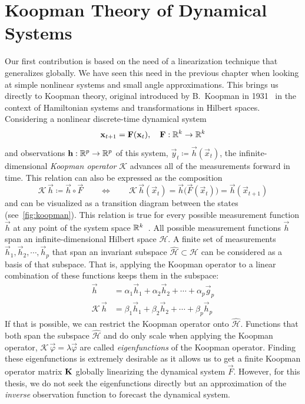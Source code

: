 \section{Koopman Theory of Dynamical Systems}
	Our first contribution is based on the need of a linearization technique that generalizes globally. We have seen this need in the previous chapter when looking at simple nonlinear systems and small angle approximations. This brings us directly to Koopman theory, original introduced by B.~Koopman in 1931~\cite{koopmanHamiltonianSystemsTransformation1931} in the context of Hamiltonian systems and transformations in Hilbert spaces. Considering a nonlinear discrete-time dynamical system
	\begin{equation*}
		\boldsymbol{\mathrm{x}}_{t + 1} = \boldsymbol{\mathrm{F}}(\boldsymbol{\mathrm{x}}_t),\quad \boldsymbol{\mathrm{F}} : \mathbb{R}^k \to \mathbb{R}^k
	\end{equation*}
	and observations \( \boldsymbol{\mathrm{h}} : \mathbb{R}^p \to \mathbb{R}^p \) of this system, \ie \( \vec{y}_t \coloneqq \vec{h}(\vec{x}_t) \), the infinite-dimensional \emph{Koopman operator} \(\mathcal{K}\) advances all of the measurements forward in time. This relation can also be expressed as the composition
	\begin{equation*}
		\mathcal{K} \, \vec{h} \coloneqq \vec{h} \circ \vec{F} \qquad\iff\qquad \mathcal{K} \, \vec{h}(\vec{x}_t) = \vec{h}\big( \vec{F}(\vec{x}_t) \big) = \vec{h}(\vec{x}_{t + 1})
	\end{equation*}
	and can be visualized as a transition diagram between the states (see~\autoref{fig:koopman}). This relation is true for every possible measurement function \( \vec{h} \) at any point of the system space \( \mathbb{R}^k \)~\cite{bruntonKoopmanInvariantSubspaces2016}. All possible measurement functions \( \vec{h} \) span an infinite-dimensional Hilbert space \( \mathcal{H} \). A finite set of measurements \( \vec{h}_1, \vec{h}_2, \cdots, \vec{h}_p \) that span an invariant subspace \( \hat{\mathcal{H}} \subset \mathcal{H} \) can be considered as a basis of that subspace. That is, applying the Koopman operator to a linear combination of these functions keeps them in the subspace:
	\begin{align*}
		\vec{h} &= \alpha_1 \vec{h}_1 + \alpha_2 \vec{h}_2 + \cdots + \alpha_p \vec{g}_p \\
		\mathcal{K} \, \vec{h} &= \beta_1 \vec{h}_1 + \beta_2 \vec{h}_2 + \cdots + \beta_p \vec{h}_p
	\end{align*}
	If that is possible, we can restrict the Koopman operator onto \( \hat{\mathcal{H}} \). Functions that both span the subspace \(\hat{\mathcal{H}}\) and do only scale when applying the Koopman operator, \ie \( \mathcal{K} \, \vec{\varphi} = \lambda \vec{\varphi} \) are called \emph{eigenfunctions} of the Koopman operator. Finding these eigenfunctions is extremely desirable as it allows us to get a finite Koopman operator matrix \( \boldsymbol{\mathrm{K}} \) globally linearizing the dynamical system \( \vec{F} \). However, for this thesis, we do not seek the eigenfunctions directly but an approximation of the \emph{inverse} observation function to forecast the dynamical system.


